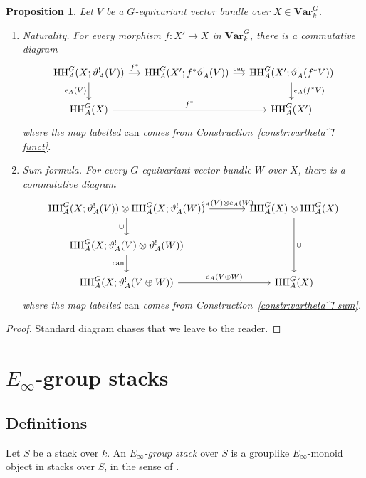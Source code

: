 \documentclass[12pt, oneside]{amsart}
\numberwithin{equation}{section}
\newtheorem{proposition}[subsubsection]{Proposition}
\theoremstyle{remark}
\theoremstyle{plain}
\newcommand{\Var}{\mathbf{Var}_{k}}
\newcommand{\HH}{\operatorname{HH}}
\begin{document}
\begin{proposition}\label{prop:euler properties}
Let $V$ be a $G$-equivariant vector bundle over $X \in \Var^G$.
\begin{enumerate}
\item \emph{Naturality.}
For every morphism $f : X' \to X$ in $\Var^G$, there is a commutative diagram
\[\begin{tikzcd}[column sep=small]
  \HH_A^G(X; \vartheta^!_A(V)) \ar{r}{f^*}\ar[swap]{d}{e_A(V)}
  & \HH_A^G(X'; f^*\vartheta^!_A(V)) \ar{r}{\mathrm{can}}
  & \HH_A^G(X'; \vartheta^!_A(f^*V)) \ar{d}{e_A(f^*V)}
  \\
  \HH_A^G(X) \ar{rr}{f^*}
  &
  & \HH_A^G(X')
\end{tikzcd}\]
where the map labelled $\mathrm{can}$ comes from Construction~\ref{constr:vartheta^! funct}.

\item \emph{Sum formula.}
For every $G$-equivariant vector bundle $W$ over $X$, there is a commutative diagram
\[\begin{tikzcd}[column sep=large]
  \HH_A^G(X; \vartheta^!_A(V)) \otimes \HH_A^G(X; \vartheta^!_A(W)) \ar{r}{e_A(V) \otimes e_A(W)}\ar[swap]{d}{\cup}
  & \HH_A^G(X) \otimes \HH_A^G(X) \ar{dd}{\cup}
  \\
  \HH_A^G(X; \vartheta^!_A(V) \otimes \vartheta^!_A(W)) \ar[swap]{d}{\mathrm{can}}
  &
  \\
  \HH_A^G(X; \vartheta^!_A(V \oplus W)) \ar{r}{e_A(V \oplus W)}
  & \HH_A^G(X)
\end{tikzcd}\]
where the map labelled $\mathrm{can}$ comes from Construction~\ref{constr:vartheta^! sum}.
\end{enumerate}
\end{proposition}

\begin{proof}
Standard diagram chases that we leave to the reader.
\end{proof}

\appendix

\section{$E_\infty$-group stacks}
\label{app:strictification}

\subsection{Definitions}

Let $S$ be a stack over $k$.
An \emph{$E_\infty$-group stack} over $S$ is a grouplike $E_\infty$-monoid object in stacks over $S$, in the sense of \cite[Def.~1.3.8]{LurieEll1}.
\end{document}
